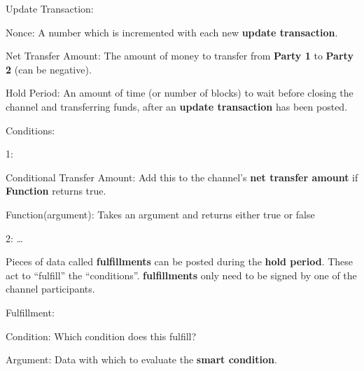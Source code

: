 \documentclass[a4paper]{article}
\newcommand{\bgls}[1]{\textbf{\gls{#1}}}
\newcommand{\bglspl}[1]{\textbf{\glspl{#1}}}
\newenvironment{mydescription}
{\begin{description}
  \setlength{\itemsep}{5pt}
    \setlength{\parskip}{0pt}
    \setlength{\labelsep}{5pt}
}{
\end{description}}
\begin{document}
\begin{mdframed}[style=message]
  \begin{mydescription}
  \item[Update Transaction:] \hfill
    \item[Nonce:] A number which is incremented with each new \bgls{update transaction}.
    \item[Net Transfer Amount:] The amount of money to transfer from \textbf{Party 1} to \textbf{Party 2} (can be negative).
    \item[Hold Period:] An amount of time (or number of blocks) to wait before closing the channel and transferring funds, after an \bgls{update transaction} has been posted.
    \begin{mydescription}
    \item[Conditions:] \hfill
      \begin{mydescription}
      \item[1:] \hfill
        \begin{mydescription}
        \item[Conditional Transfer Amount:] Add this to the channel's \bgls{net transfer amount} if \textbf{Function} returns true.
        \item[Function(argument):] Takes an argument and returns either true or false
        \end{mydescription}
      \item[2:] \ldots
      \end{mydescription}
    \end{mydescription}
  \end{mydescription}
\end{mdframed}

Pieces of data called \bglspl{fulfillment} can be posted during the \bgls{hold period}. These act to ``fulfill'' the ``conditions''. \bglspl{fulfillment} only need to be signed by one of the channel participants.

\begin{mdframed}[style=message]
  \begin{mydescription}
  \item[Fulfillment:] \hfill
    \begin{mydescription}
    \item[Condition:] Which condition does this fulfill?
    \item[Argument:] Data with which to evaluate the \bgls{smart condition}.
    \end{mydescription}
  \end{mydescription}
\end{mdframed}
\end{document}
